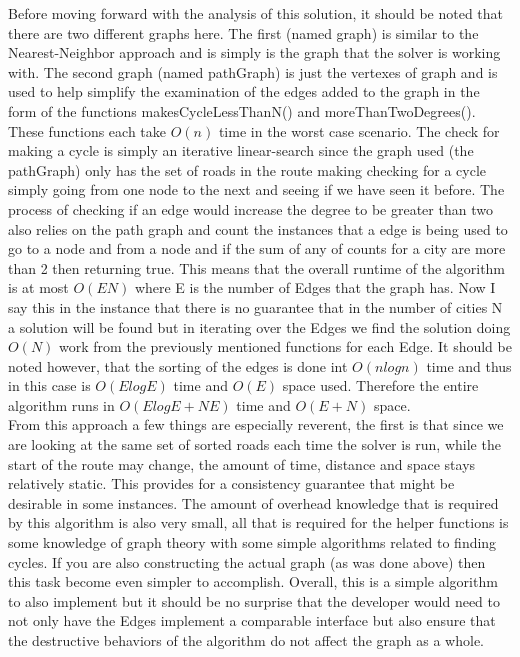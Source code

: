 \documentclass[midd]{thesis}
\newcommand{\tab}{\hspace*{2em}}
\begin{document}
\tab Before moving forward with the analysis of this solution, it should be noted that there are two different graphs here. The first (named graph) is similar to the Nearest-Neighbor approach and is simply is the graph that the solver is working with. The second graph (named pathGraph) is just the vertexes of graph and is used to help simplify the examination of the edges added to the graph in the form of the functions makesCycleLessThanN() and moreThanTwoDegrees(). These functions each take $O(n)$ time in the worst case scenario. The check for making a cycle is simply an iterative linear-search since the graph used (the pathGraph) only has the set of roads in the route making checking for a cycle simply going from one node to the next and seeing if we have seen it before. The process of checking if an edge would increase the degree to be greater than two also relies on the path graph and count the instances that a edge is being used to go to a node and from a node and if the sum of any of counts for a city are more than 2 then returning true. This means that the overall runtime of the algorithm is at most $O(EN)$ where E is the number of Edges that the graph has. Now I say this in the instance that there is no guarantee that in the number of cities N a solution will be found but in iterating over the Edges we find the solution doing $O(N)$ work from the previously mentioned functions for each Edge. It should be noted however, that the sorting of the edges is done int $O(nlogn)$ time and thus in this case is $O(ElogE)$ time and $O(E)$ space used. Therefore the entire algorithm runs in $O(ElogE + NE)$ time and $O(E+N)$ space.\\
\tab From this approach a few things are especially reverent, the first is that since we are looking at the same set of sorted roads each time the solver is run, while the start of the route may change, the amount of time, distance and space stays relatively static. This provides for a consistency guarantee that might be desirable in some instances. The amount of overhead knowledge that is required by this algorithm is also very small, all that is required for the helper functions is some knowledge of graph theory with some simple algorithms related to finding cycles. If you are also constructing the actual graph (as was done above) then this task become even simpler to accomplish. Overall, this is a simple algorithm to also implement but it should be no surprise that the developer would need to not only have the Edges implement a comparable interface but also ensure that the destructive behaviors of the algorithm do not affect the graph as a whole.
\end{document}
